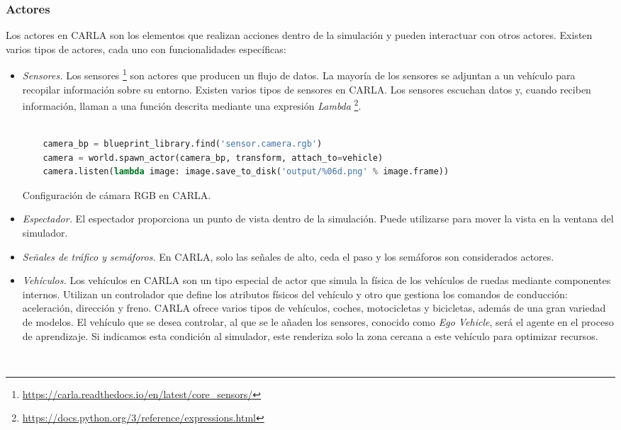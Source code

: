 \subsubsection{Actores}

Los actores en CARLA son los elementos que realizan acciones dentro de la simulación y pueden interactuar con otros actores. Existen varios tipos de actores, cada uno con funcionalidades específicas:


\begin{itemize}
    \item \textit{Sensores.} Los sensores \footnote{\url{https://carla.readthedocs.io/en/latest/core_sensors/}} son actores que producen un flujo de datos. La mayoría de los sensores se adjuntan a un vehículo para recopilar información sobre su entorno. Existen varios tipos de sensores en CARLA. Los sensores escuchan datos y, cuando reciben información, llaman a una función descrita mediante una expresión \textit{Lambda} \footnote{\url{https://docs.python.org/3/reference/expressions.html}}. 

	\begin{code}[h]
	\begin{lstlisting}[language=python]
	
	camera_bp = blueprint_library.find('sensor.camera.rgb')
	camera = world.spawn_actor(camera_bp, transform, attach_to=vehicle)
	camera.listen(lambda image: image.save_to_disk('output/%06d.png' % image.frame))

	\end{lstlisting}
	\caption[Configuración de cámara RGB en CARLA]{Configuración de cámara RGB en CARLA.}
	\label{cod:camara_carla}
	\end{code}

    \item \textit{Espectador.} El espectador  proporciona un punto de vista dentro de la simulación. Puede utilizarse para mover la vista en la ventana del simulador.
    \item \textit{Señales de tráfico y semáforos.} En CARLA, solo las señales de alto, ceda el paso y los semáforos son considerados actores.

    \item  \textit{Vehículos.} Los vehículos en CARLA son un tipo especial de actor que simula la física de los vehículos de ruedas mediante componentes internos. Utilizan un controlador que define los atributos físicos del vehículo y otro que gestiona los comandos de conducción: aceleración, dirección y freno. CARLA ofrece varios tipos de vehículos, coches, motocicletas y bicicletas, además de una gran variedad de modelos. El vehículo que se desea controlar, al que se le añaden los sensores, conocido como \textit{Ego Vehicle}, será el agente en el proceso de aprendizaje. Si indicamos esta condición al simulador, este renderiza solo la zona cercana a este vehículo para optimizar recursos.
	\begin{code}[h]
	\begin{lstlisting}[language=python]
	

\end{lstlisting}
\end{code}
\end{itemize}
